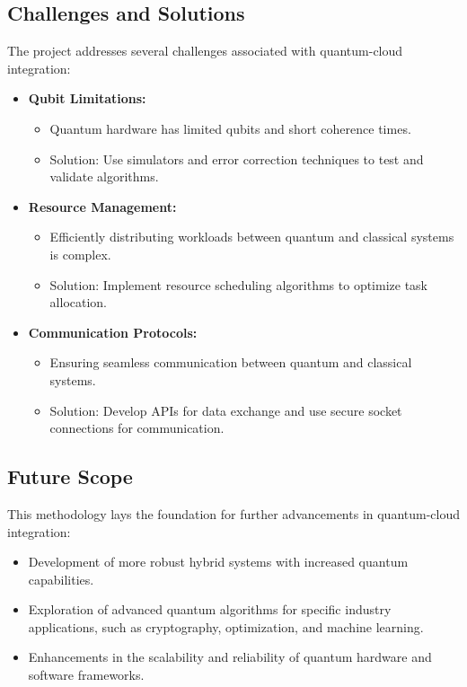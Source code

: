 \documentclass[conference]{IEEEtran}
\begin{document}
\subsection{Challenges and Solutions}
The project addresses several challenges associated with quantum-cloud integration:
\begin{itemize}
    \item \textbf{Qubit Limitations:}
    \begin{itemize}
        \item Quantum hardware has limited qubits and short coherence times.
        \item Solution: Use simulators and error correction techniques to test and validate algorithms.
    \end{itemize}
    \item \textbf{Resource Management:}
    \begin{itemize}
        \item Efficiently distributing workloads between quantum and classical systems is complex.
        \item Solution: Implement resource scheduling algorithms to optimize task allocation.
    \end{itemize}
    \item \textbf{Communication Protocols:}
    \begin{itemize}
        \item Ensuring seamless communication between quantum and classical systems.
        \item Solution: Develop APIs for data exchange and use secure socket connections for communication.
    \end{itemize}
\end{itemize}

\subsection{Future Scope}
This methodology lays the foundation for further advancements in quantum-cloud integration:
\begin{itemize}
    \item Development of more robust hybrid systems with increased quantum capabilities.
    \item Exploration of advanced quantum algorithms for specific industry applications, such as cryptography, optimization, and machine learning.
    \item Enhancements in the scalability and reliability of quantum hardware and software frameworks.
\end{itemize}
\end{document}
